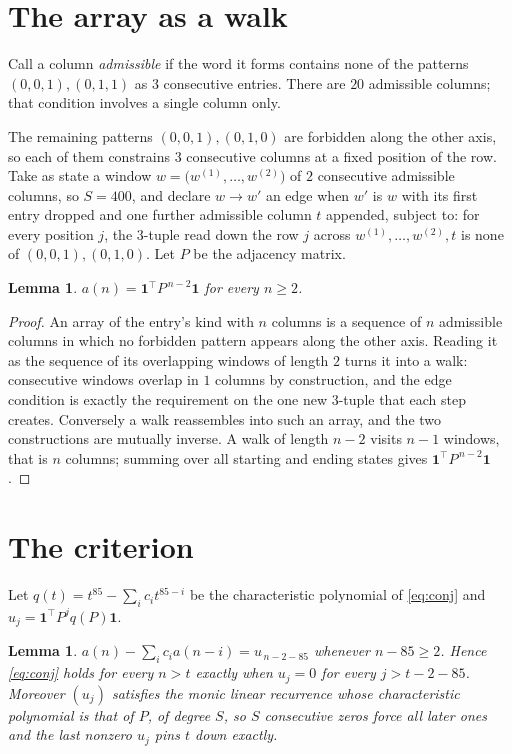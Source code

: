 \documentclass[11pt,a4paper]{article}
\theoremstyle{plain}
\newtheorem{lemma}[theorem]{Lemma}
\theoremstyle{definition}
\begin{document}
\section{The array as a walk}

Call a column \emph{admissible} if the word it forms contains none of the patterns
$(0,0,1), (0,1,1)$ as $3$ consecutive entries. There are $20$ admissible columns; that condition
involves a single column only.

The remaining patterns $(0,0,1), (0,1,0)$ are forbidden along the other axis, so each of them
constrains $3$ consecutive columns at a fixed position of the row. Take as state a
window $w=\bigl(w^{(1)},\dots,w^{(2)}\bigr)$ of $2$ consecutive admissible
columns, so $S=400$, and declare $w\to w'$ an edge when $w'$ is $w$ with its first entry
dropped and one further admissible column $t$ appended, subject to: for every position
$j$, the $3$-tuple read down the row $j$ across $w^{(1)},\dots,w^{(2)},t$
is none of $(0,0,1), (0,1,0)$. Let $P$ be the adjacency matrix.

\begin{lemma}\label{lem:walk}
$a(n)=\mathbf{1}^{\!\top}P^{\,n-2}\mathbf{1}$ for every $n\ge2$.
\end{lemma}

\begin{proof}
An array of the entry's kind with $n$ columns is a sequence of $n$ admissible columns in
which no forbidden pattern appears along the other axis. Reading it as the sequence of its
overlapping windows of length $2$ turns it into a walk: consecutive windows overlap in
$1$ columns by construction, and the edge condition is exactly the requirement on the one
new $3$-tuple that each step creates. Conversely a walk reassembles into such an array,
and the two constructions are mutually inverse. A walk of length $n-2$ visits $n-1$
windows, that is $n$ columns; summing over all starting and ending states gives
$\mathbf{1}^{\!\top}P^{\,n-2}\mathbf{1}$.
\end{proof}

\section{The criterion}

Let $q(t)=t^{85}-\sum_i c_i t^{85-i}$ be the characteristic polynomial of
\eqref{eq:conj} and $u_j=\mathbf{1}^{\!\top}P^{j}q(P)\mathbf{1}$.

\begin{lemma}\label{lem:crit}
$a(n)-\sum_i c_i a(n-i)=u_{\,n-2-85}$ whenever $n-85\ge2$. Hence
\eqref{eq:conj} holds for every $n>t$ exactly when $u_j=0$ for every
$j>t-2-85$. Moreover $(u_j)$ satisfies the monic linear recurrence whose
characteristic polynomial is that of $P$, of degree $S$, so $S$ consecutive zeros force all
later ones and the last nonzero $u_j$ pins $t$ down exactly.
\end{lemma}
\end{document}
